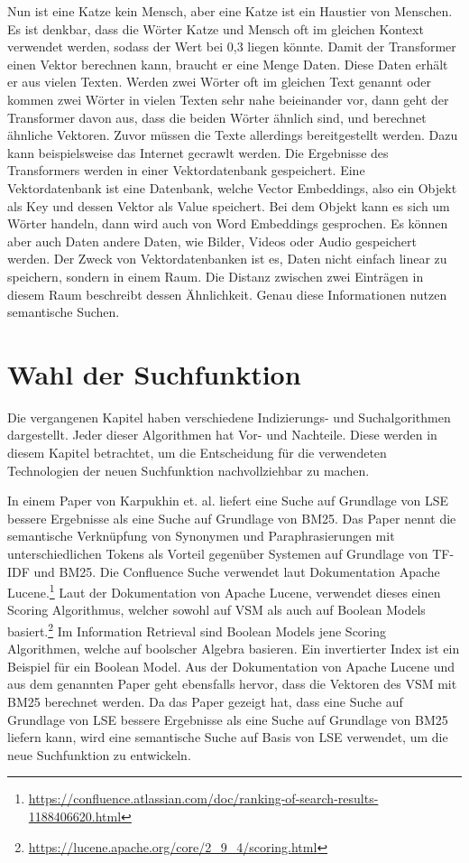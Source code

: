 Nun ist eine Katze kein Mensch, aber eine Katze ist ein Haustier von Menschen.
Es ist denkbar, dass die Wörter Katze und Mensch oft im gleichen Kontext verwendet werden, sodass der Wert bei 0,3 liegen könnte.
Damit der Transformer einen Vektor berechnen kann, braucht er eine Menge Daten.
Diese Daten erhält er aus vielen Texten.
Werden zwei Wörter oft im gleichen Text genannt oder kommen zwei Wörter in vielen Texten sehr nahe beieinander vor, dann geht der Transformer davon aus, dass die beiden Wörter ähnlich sind, und berechnet ähnliche Vektoren.
Zuvor müssen die Texte allerdings bereitgestellt werden.
Dazu kann beispielsweise das Internet gecrawlt werden.
Die Ergebnisse des Transformers werden in einer Vektordatenbank gespeichert.
Eine Vektordatenbank ist eine Datenbank, welche Vector Embeddings, also ein Objekt als Key und dessen Vektor als Value speichert.
Bei dem Objekt kann es sich um Wörter handeln, dann wird auch von Word Embeddings gesprochen.
Es können aber auch Daten andere Daten, wie Bilder, Videos oder Audio gespeichert werden.
Der Zweck von Vektordatenbanken ist es, Daten nicht einfach linear zu speichern, sondern in einem Raum.
Die Distanz zwischen zwei Einträgen in diesem Raum beschreibt dessen Ähnlichkeit.
Genau diese Informationen nutzen semantische Suchen.

\section{Wahl der Suchfunktion}
Die vergangenen Kapitel haben verschiedene Indizierungs- und Suchalgorithmen dargestellt.
Jeder dieser Algorithmen hat Vor- und Nachteile.
Diese werden in diesem Kapitel betrachtet, um die Entscheidung für die verwendeten Technologien der neuen Suchfunktion nachvollziehbar zu machen.

In einem Paper von Karpukhin et. al. liefert eine Suche auf Grundlage von LSE bessere Ergebnisse als eine Suche auf Grundlage von BM25.\cite{Karpukhin_Oguz_Min_Lewis_Wu_Edunov_Chen_Yih_2020}
Das Paper nennt die semantische Verknüpfung von Synonymen und Paraphrasierungen mit unterschiedlichen Tokens als Vorteil gegenüber Systemen auf Grundlage von TF-IDF und BM25.
Die Confluence Suche verwendet laut Dokumentation Apache Lucene.\footnote{\url{https://confluence.atlassian.com/doc/ranking-of-search-results-1188406620.html}}
Laut der Dokumentation von Apache Lucene, verwendet dieses einen Scoring Algorithmus, welcher sowohl auf VSM als auch auf Boolean Models basiert.\footnote{\url{https://lucene.apache.org/core/2_9_4/scoring.html}}
Im Information Retrieval sind Boolean Models jene Scoring Algorithmen, welche auf boolscher Algebra basieren.
Ein invertierter Index ist ein Beispiel für ein Boolean Model.
Aus der Dokumentation von Apache Lucene und aus dem genannten Paper geht ebensfalls hervor, dass die Vektoren des VSM mit BM25 berechnet werden.
Da das Paper gezeigt hat, dass eine Suche auf Grundlage von LSE bessere Ergebnisse als eine Suche auf Grundlage von BM25 liefern kann, wird eine semantische Suche auf Basis von LSE verwendet, um die neue Suchfunktion zu entwickeln.



